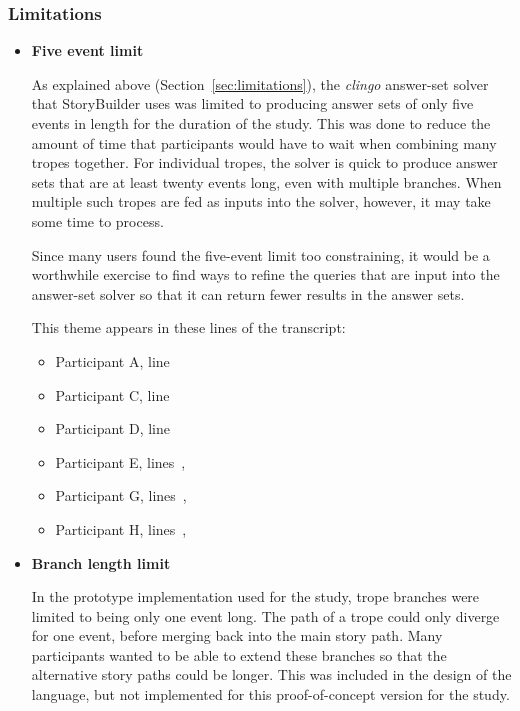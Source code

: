 \documentclass[11pt]{report}
\begin{document}
\subsubsection{Limitations}
\begin{itemize}
\item \textbf{Five event limit}

As explained above (Section~\ref{sec:limitations}), the \emph{clingo} answer-set solver that StoryBuilder uses
was limited to producing answer sets of only five events in length for the
duration of the study. This was done to reduce the amount of time that
participants would have to wait when combining many tropes together. For
individual tropes, the solver is quick to produce answer sets that are at least
twenty events long, even with multiple branches. When multiple such tropes are
fed as inputs into the solver, however, it may take some time to process.

Since many users found the five-event limit too constraining, it would be a
worthwhile exercise to find ways to refine the queries that are input into the
answer-set solver so that it can return fewer results in the answer sets.

This theme appears in these lines of the transcript:

\begin{itemize}
\item Participant A, line~
\item Participant C, line~
\item Participant D, line~
\item Participant E, lines~,~
\item Participant G, lines~,~
\item Participant H, lines~,~
\end{itemize}

\item \textbf{Branch length limit}

In the prototype implementation used for the study, trope branches were limited
to being only one event long. The path of a trope could only diverge for one
event, before merging back into the main story path. Many participants wanted to
be able to extend these branches so that the alternative story paths could be
longer. This was included in the design of the language, but not implemented for
this proof-of-concept version for the study.


\end{itemize}
\end{document}
